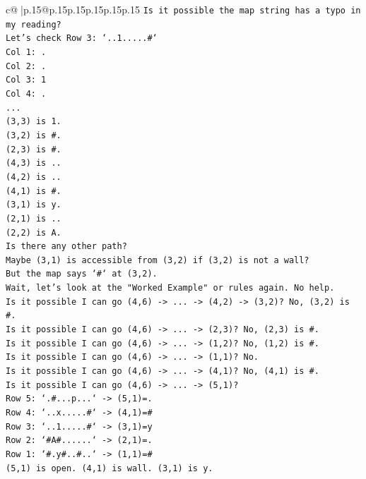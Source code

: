\documentclass{article}
\begin{document}
{\begin{supertabular}{c@{$\;$}|p{.15\linewidth}@{}p{.15\linewidth}p{.15\linewidth}p{.15\linewidth}p{.15\linewidth}p{.15\linewidth}}
{{{\texttt{Is it possible the map string has a typo in my reading?} \\
\texttt{Let's check Row 3: `..1.....\#`} \\
\texttt{Col 1: .} \\
\texttt{Col 2: .} \\
\texttt{Col 3: 1} \\
\texttt{Col 4: .} \\
\texttt{...} \\
\texttt{(3,3) is 1.} \\
\texttt{(3,2) is \#.} \\
\texttt{(2,3) is \#.} \\
\texttt{(4,3) is ..} \\
\texttt{(4,2) is ..} \\
\texttt{(4,1) is \#.} \\
\texttt{(3,1) is y.} \\
\texttt{(2,1) is ..} \\
\texttt{(2,2) is A.} \\
\texttt{Is there any other path?} \\
\texttt{Maybe (3,1) is accessible from (3,2) if (3,2) is not a wall?} \\
\texttt{But the map says `\#` at (3,2).} \\
\texttt{Wait, let's look at the "Worked Example" or rules again. No help.} \\
\texttt{Is it possible I can go (4,6) {-}> ... {-}> (4,2) {-}> (3,2)? No, (3,2) is \#.} \\
\texttt{Is it possible I can go (4,6) {-}> ... {-}> (2,3)? No, (2,3) is \#.} \\
\texttt{Is it possible I can go (4,6) {-}> ... {-}> (1,2)? No, (1,2) is \#.} \\
\texttt{Is it possible I can go (4,6) {-}> ... {-}> (1,1)? No.} \\
\texttt{Is it possible I can go (4,6) {-}> ... {-}> (4,1)? No, (4,1) is \#.} \\
\texttt{Is it possible I can go (4,6) {-}> ... {-}> (5,1)?} \\
\texttt{Row 5: `.\#...p...` {-}> (5,1)=.} \\
\texttt{Row 4: `..x.....\#` {-}> (4,1)=\#} \\
\texttt{Row 3: `..1.....\#` {-}> (3,1)=y} \\
\texttt{Row 2: `\#A\#......` {-}> (2,1)=.} \\
\texttt{Row 1: `\#.y\#..\#..` {-}> (1,1)=\#} \\
\texttt{(5,1) is open. (4,1) is wall. (3,1) is y.} \\
}}}
\end{supertabular}}
\end{document}
